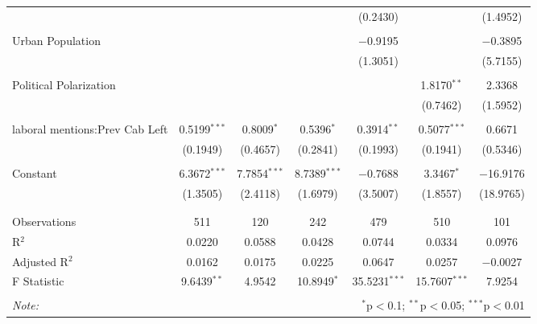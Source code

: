 \begin{table}[!htbp]
\begin{tabular}{@{\extracolsep{5pt}}lcccccc}
  &  &  &  & (0.2430) &  & (1.4952) \\ 
  & & & & & & \\ 
 Urban Population &  &  &  & $-$0.9195 &  & $-$0.3895 \\ 
  &  &  &  & (1.3051) &  & (5.7155) \\ 
  & & & & & & \\ 
 Political Polarization &  &  &  &  & 1.8170$^{**}$ & 2.3368 \\ 
  &  &  &  &  & (0.7462) & (1.5952) \\ 
  & & & & & & \\ 
 laboral mentions:Prev Cab Left & 0.5199$^{***}$ & 0.8009$^{*}$ & 0.5396$^{*}$ & 0.3914$^{**}$ & 0.5077$^{***}$ & 0.6671 \\ 
  & (0.1949) & (0.4657) & (0.2841) & (0.1993) & (0.1941) & (0.5346) \\ 
  & & & & & & \\ 
 Constant & 6.3672$^{***}$ & 7.7854$^{***}$ & 8.7389$^{***}$ & $-$0.7688 & 3.3467$^{*}$ & $-$16.9176 \\ 
  & (1.3505) & (2.4118) & (1.6979) & (3.5007) & (1.8557) & (18.9765) \\ 
  & & & & & & \\ 
\hline \\[-1.8ex] 
Observations & 511 & 120 & 242 & 479 & 510 & 101 \\ 
R$^{2}$ & 0.0220 & 0.0588 & 0.0428 & 0.0744 & 0.0334 & 0.0976 \\ 
Adjusted R$^{2}$ & 0.0162 & 0.0175 & 0.0225 & 0.0647 & 0.0257 & $-$0.0027 \\ 
F Statistic & 9.6439$^{**}$ & 4.9542 & 10.8949$^{*}$ & 35.5231$^{***}$ & 15.7607$^{***}$ & 7.9254 \\ 
\hline 
\hline \\[-1.8ex] 
\textit{Note:}  & \multicolumn{6}{r}{$^{*}$p$<$0.1; $^{**}$p$<$0.05; $^{***}$p$<$0.01} \\ 
\end{tabular} 
\end{table} 
